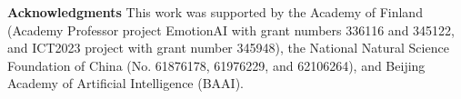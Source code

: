 \documentclass[10pt,journal,compsoc]{IEEEtran}
\begin{document}
\vspace{0.5em}

\noindent\textbf{Acknowledgments} \quad This work was supported by the Academy of Finland (Academy Professor project EmotionAI with grant numbers 336116 and 345122, and ICT2023 project with grant number 345948), the National Natural Science Foundation of China (No. 61876178, 61976229, and 62106264), and Beijing Academy of Artificial Intelligence (BAAI).






\ifCLASSOPTIONcaptionsoff
  \newpage
\fi





%
%
%



% 
\end{document}
